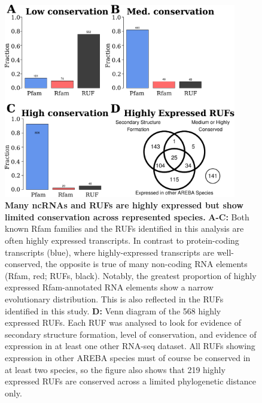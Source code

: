 \documentclass[10pt]{article}
\begin{document}
\begin{figure}[!ht]
\begin{center}
\includegraphics[width=4in]{figures/figure2.pdf}
\end{center}
\caption{ {\bf Many ncRNAs and RUFs are highly expressed
    but show limited conservation across represented species.} {\bf
    A-C:} Both known Rfam families and the RUFs identified in this
  analysis are often highly expressed
  transcripts. In contrast to protein-coding transcripts (blue), where
  highly-expressed transcripts are well-conserved, the opposite is
  true of many non-coding RNA elements (Rfam, red; RUFs,
  black). Notably, the greatest proportion of highly expressed
  Rfam-annotated RNA elements show a narrow evolutionary
  distribution. This is also reflected in the RUFs identified in this
  study. {\bf D:} Venn diagram of the 568 highly expressed RUFs. Each
  RUF was analysed to look for evidence of secondary structure
  formation, level of conservation, and evidence of expression in at
  least one other RNA-seq dataset. All RUFs showing expression in
  other AREBA species must of course be conserved in at least two
  species, so the figure also shows that 219 highly expressed RUFs are
  conserved across a limited phylogenetic distance only.}
\label{fig:2}
\end{figure}
\end{document}
